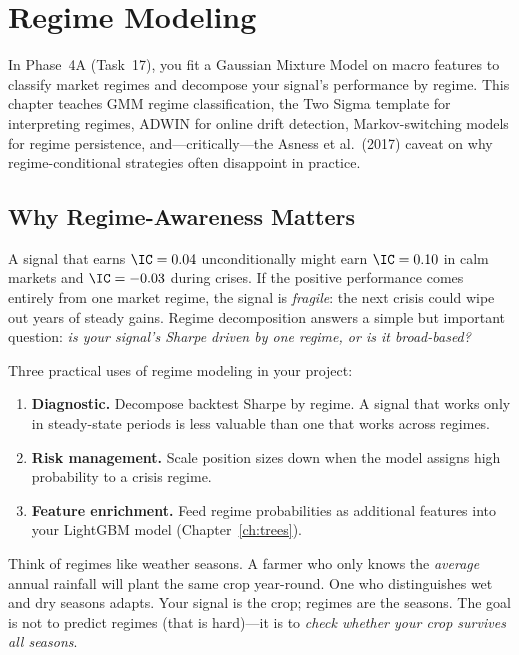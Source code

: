 \chapter{Regime Modeling}
\label{ch:regimes}

\begin{projectconnection}
In Phase~4A (Task~17), you fit a Gaussian Mixture Model on macro features to
classify market regimes and decompose your signal's performance by regime.
This chapter teaches GMM regime classification, the Two Sigma template for
interpreting regimes, ADWIN for online drift detection, Markov-switching
models for regime persistence, and---critically---the Asness et al.\ (2017)
caveat on why regime-conditional strategies often disappoint in practice.
\end{projectconnection}

\section{Why Regime-Awareness Matters}
\label{sec:regimes:why}

A signal that earns $\IC = 0.04$ unconditionally might earn $\IC = 0.10$ in
calm markets and $\IC = -0.03$ during crises.  If the positive performance
comes entirely from one market regime, the signal is \emph{fragile}: the
next crisis could wipe out years of steady gains.  Regime decomposition
answers a simple but important question: \emph{is your signal's Sharpe
driven by one regime, or is it broad-based?}

Three practical uses of regime modeling in your project:

\begin{enumerate}[leftmargin=1.5em]
  \item \textbf{Diagnostic.}  Decompose backtest Sharpe by regime.  A signal
    that works only in steady-state periods is less valuable than one that
    works across regimes.
  \item \textbf{Risk management.}  Scale position sizes down when the model
    assigns high probability to a crisis regime.
  \item \textbf{Feature enrichment.}  Feed regime probabilities as
    additional features into your LightGBM model (Chapter~\ref{ch:trees}).
\end{enumerate}

\begin{intuition}
Think of regimes like weather seasons.  A farmer who only knows the
\emph{average} annual rainfall will plant the same crop year-round.  One who
distinguishes wet and dry seasons adapts.  Your signal is the crop;
regimes are the seasons.  The goal is not to predict regimes (that is
hard)---it is to \emph{check whether your crop survives all seasons}.
\end{intuition}

